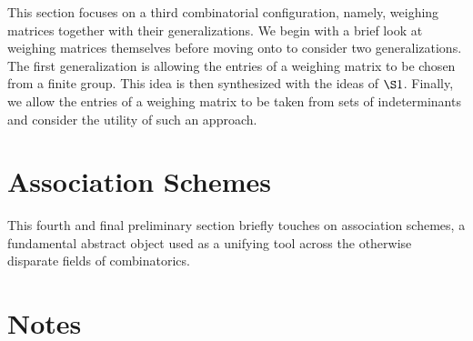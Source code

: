 \documentclass[../../main]{subfiles}
\begin{document}
This section focuses on a third combinatorial configuration, namely, weighing
matrices together with their generalizations. We begin with a brief look at weighing matrices themselves before moving onto to consider two generalizations. The first generalization is allowing the entries of a weighing matrix to be chosen from a finite group. This idea is then synthesized with the ideas of $\S1$. Finally, we allow the entries of a weighing matrix to be taken from sets of indeterminants and consider the utility of such an approach.

\dinkus



\fancyhf{}

\fancyhead[RO,LE]{\thepage}

\section{Association Schemes}

This fourth and final preliminary section briefly touches on association schemes, a fundamental abstract object used as a unifying tool across the otherwise disparate fields of combinatorics. 

\dinkus



\singlespace

\fancyhf{}

\fancyhead[RO,LE]{\thepage}

\section*{\centering Notes}
\theanotes

\doublespacing

\biblio
\end{document}

